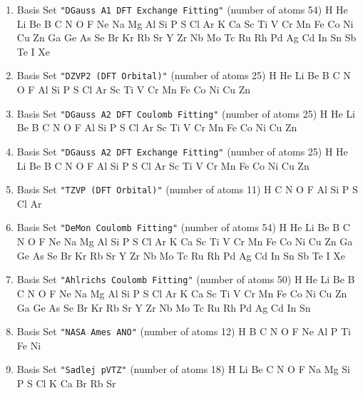 \begin{enumerate}
\item Basis Set \verb#"DGauss A1 DFT Exchange Fitting"# (number of atoms 54)  \newline 
  H He Li Be B C N O F Ne Na Mg Al Si P S Cl Ar K Ca Sc Ti V Cr Mn
 Fe Co Ni Cu Zn Ga Ge As Se Br Kr Rb Sr Y Zr Nb Mo Tc Ru Rh Pd Ag Cd In Sn
 Sb Te I Xe


\item Basis Set \verb#"DZVP2 (DFT Orbital)"# (number of atoms 25)  \newline 
  H He Li Be B C N O F Al Si P S Cl Ar Sc Ti V Cr Mn Fe Co Ni Cu Zn



\item Basis Set \verb#"DGauss A2 DFT Coulomb Fitting"# (number of atoms 25)  \newline 
  H He Li Be B C N O F Al Si P S Cl Ar Sc Ti V Cr Mn Fe Co Ni Cu Zn



\item Basis Set \verb#"DGauss A2 DFT Exchange Fitting"# (number of atoms 25)  \newline 
  H He Li Be B C N O F Al Si P S Cl Ar Sc Ti V Cr Mn Fe Co Ni Cu Zn



\item Basis Set \verb#"TZVP (DFT Orbital)"# (number of atoms 11)  \newline 
  H C N O F Al Si P S Cl Ar


\item Basis Set \verb#"DeMon Coulomb Fitting"# (number of atoms 54)  \newline 
  H He Li Be B C N O F Ne Na Mg Al Si P S Cl Ar K Ca Sc Ti V Cr Mn
 Fe Co Ni Cu Zn Ga Ge As Se Br Kr Rb Sr Y Zr Nb Mo Tc Ru Rh Pd Ag Cd In Sn
 Sb Te I Xe


\item Basis Set \verb#"Ahlrichs Coulomb Fitting"# (number of atoms 50)  \newline 
  H He Li Be B C N O F Ne Na Mg Al Si P S Cl Ar K Ca Sc Ti V Cr Mn
 Fe Co Ni Cu Zn Ga Ge As Se Br Kr Rb Sr Y Zr Nb Mo Tc Ru Rh Pd Ag Cd In Sn



\item Basis Set \verb#"NASA Ames ANO"# (number of atoms 12)  \newline 
  H B C N O F Ne Al P Ti Fe Ni


\item Basis Set \verb#"Sadlej pVTZ"# (number of atoms 18)  \newline 
  H Li Be C N O F Na Mg Si P S Cl K Ca Br Rb Sr



\end{enumerate}
